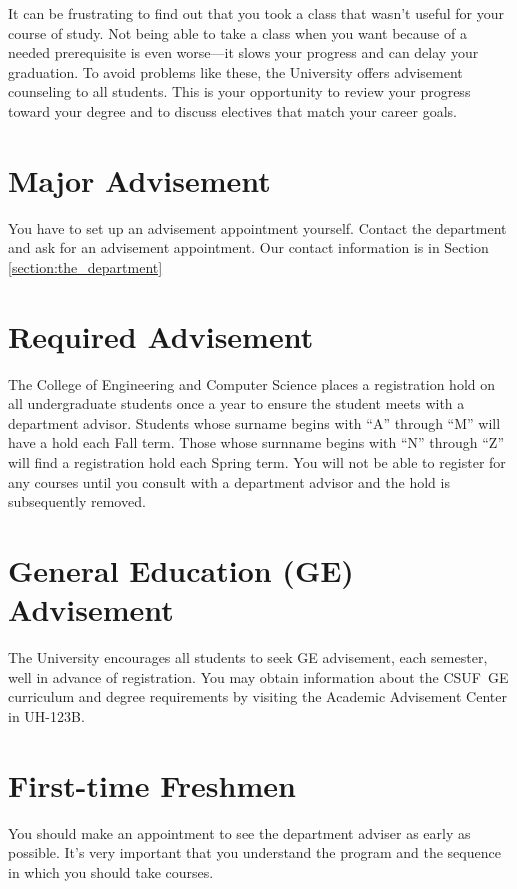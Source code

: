 \documentclass{book}
\newcommand{\CampusName}{CSUF}
\begin{document}
It can be frustrating to find out that you took a class that wasn't useful for your course of study. Not being able to take a class when you want because of a needed prerequisite is even worse---it slows your progress and can delay your graduation. To avoid problems like these, the University offers advisement counseling to all students. This is your opportunity to review your progress toward your degree and to discuss electives that match your career goals.

\section{Major Advisement}
You have to set up an advisement appointment yourself. Contact the department and ask for an advisement appointment. Our contact information is in Section \ref{section:the_department}

\section{Required Advisement}
The College of Engineering and Computer Science places a registration hold on all undergraduate students once a year to ensure the student meets with a department advisor. Students whose surname begins with ``A'' through ``M'' will have a hold each Fall term. Those whose surnname begins with ``N'' through ``Z'' will find a registration hold each Spring term.  You will not be able to register for any courses until you consult with a department advisor and the hold is subsequently removed.

\section{General Education (GE) Advisement}
 
The University encourages all students to seek GE advisement, each semester, well in advance of registration.  You may obtain information about the \CampusName~GE curriculum and degree requirements by visiting the Academic Advisement Center in UH-123B.

\section{First-time Freshmen}
You should make an appointment to see the department adviser as early as possible. It's very important that you understand the program and the sequence in which you should take courses.
\end{document}
